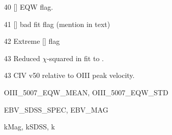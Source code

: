 \begin{itemize}
  \item[40] [\ion{O}{III}] EQW flag. 

  \item[41] [\ion{O}{III}] bad fit flag (mention in text)

  \item[42] Extreme [] flag  

  \item[43] Reduced $\chi$-squared in fit to \ha. 

  \item[43] CIV v50 relative to OIII peak velocity.

  \item[] OIII\_5007\_EQW\_MEAN, OIII\_5007\_EQW\_STD

  \item[] EBV\_SDSS\_SPEC, EBV\_MAG 

  \item[] kMag, kSDSS, k




\end{itemize}





